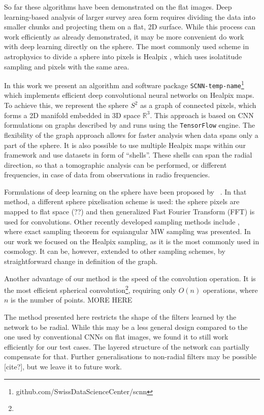\documentclass[final,twocolumn,3p,times,authoryear]{elsarticle}
\newcommand{\todo}[1]{{\color[rgb]{.6,.1,.6}{#1}}}
\newcommand{\1}{\b{1}}              %
\newcommand{\0}{\b{0}}              %
\newcommand{\pkg}[1]{\texttt{#1}}
\begin{document}
So far these algorithms have been demonstrated on the flat images.
Deep learning-based analysis of larger survey area form requires dividing the data into smaller chunks and projecting them on a flat, 2D surface.
While this process can work efficiently as already demonstrated, it may be more convenient do work with deep learning directly on the sphere.
The most commonly used scheme in astrophysics to divide a sphere into pixels is Healpix \citep{gorski2005healpix}, which uses isolatitude sampling and pixels with the same area.

In this work we present an algorithm and software package \pkg{SCNN-temp-name}\footnote{github.com/SwissDataScienceCenter/scnn} which implements efficient deep convolutional neural networks on Healpix maps.
To achieve this, we represent the sphere $S^2$ as a graph of connected pixels, which forms a 2D manifold embedded in 3D space $\mathbb{R}^3$.
This approach is based on CNN formulations on graphs described by \citet{defferrard2016convolutional} and runs using the \pkg{TensorFlow} \citep{abadi2016tensorflow} engine.
The flexibility of the graph approach allows for faster analysis when data spans only a part of the sphere.
It is also possible to use multiple Healpix maps within our framework and use datasets in form of ``shells''.
These shells can span the radial direction, so that a tomographic analysis can be performed, or different frequencies, in case of data from observations in radio frequencies.

Formulations of deep learning on the sphere have been proposed by ~\citet{cohen2017convolutional,cohen2018spherical}.
In that method, a different sphere pixelisation scheme is used: the sphere pixels are mapped to flat space (??) and then generalized Fast Fourier Transform (FFT) is used for convolutions.
Other recently developed sampling methods include \citep{mcewen2011novelsampling}, where exact sampling theorem for equiangular MW sampling was presented.
In our work we focused on the Healpix sampling, as it is the most commonly used in cosmology.
It can be, however, extended to other sampling schemes, by straightforward change in definition of the graph.

Another advantage of our method is the speed of the convolution operation.
It is the most efficient spherical convolution\footnote{\todo{provably? cannot be faster than O(n) without approximations, e.g. sketching}}, requiring only $O(n)$ operations, where $n$ is the number of points.
MORE HERE

The method presented here restricts the shape of the filters learned by the network to be radial.
While this may be a less general design compared to the one used by conventional CNNs on flat images, we found it to still work efficiently for our test cases.
The layered structure of the network can partially compensate for that.
Further generalisations to non-radial filters may be possible [cite?], but we leave it to future work.
\end{document}
